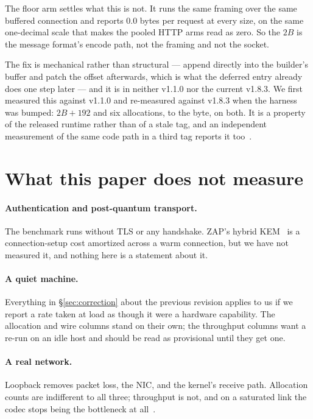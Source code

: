 \documentclass[11pt]{article}
\begin{document}
The floor arm settles what this is not. It runs the same framing over the same
buffered connection and reports 0.0 bytes per request at every size, on the same
one-decimal scale that makes the pooled HTTP arms read as zero. So the $2B$ is the
message format's encode path, not the framing and not the socket.

The fix is mechanical rather than structural --- append directly into the
builder's buffer and patch the offset afterwards, which is what the deferred entry
already does one step later --- and it is in neither v1.1.0 nor the current v1.8.3.
We first measured this against v1.1.0 and re-measured against v1.8.3 when the
harness was bumped: $2B + 192$ and six allocations, to the byte, on both. It is a
property of the released runtime rather than of a stale tag, and an independent
measurement of the same code path in a third tag reports it too~\cite{cloudbench}.

\section{What this paper does not measure}

\paragraph{Authentication and post-quantum transport.} The benchmark runs without
TLS or any handshake. ZAP's hybrid KEM~\cite{pqhybrid} is a connection-setup cost
amortized across a warm connection, but we have not measured it, and nothing here
is a statement about it.

\paragraph{A quiet machine.} Everything in \S\ref{sec:correction} about the
previous revision applies to us if we report a rate taken at load \loadHi{} as though it
were a hardware capability. The allocation and wire columns stand on their own;
the throughput columns want a re-run on an idle host and should be read as
provisional until they get one.

\paragraph{A real network.} Loopback removes packet loss, the NIC, and the
kernel's receive path. Allocation counts are indifferent to all three; throughput
is not, and on a saturated link the codec stops being the bottleneck at
all~\cite{cloudbench}.
\end{document}
